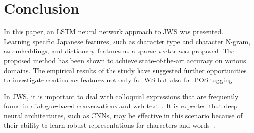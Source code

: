 \documentclass[11pt,letterpaper]{article}
\begin{document}

\section{Conclusion}
In this paper, an LSTM neural network approach to JWS was presented. Learning specific Japanese features, such as character type and character N-gram, as embeddings, and dictionary features as a sparse vector was proposed. The proposed method has been shown to achieve state-of-the-art accuracy on various domains. 
The empirical results of the study have suggested further opportunities to investigate continuous features not only for WS but also for POS tagging. 

In JWS, it is important to deal with colloquial expressions that are frequently found in dialogue-based conversations and web text~\cite{saito-EtAl:2014:Coling,sasano-kurohashi-okumura:2013:IJCNLP,kaji-kitsuregawa:2014:EMNLP2014}. It is expected that deep neural architectures, such as CNNs, may be effective in this scenario because of their ability to learn robust representations for characters and words~\cite{ling-EtAl:2015:EMNLP2}. 

\end{document}

